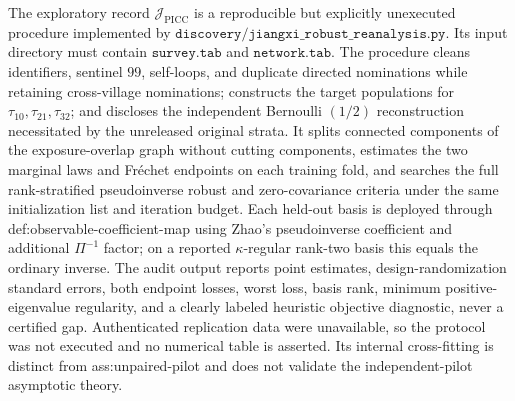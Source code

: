 The exploratory record \(\mathcal J_{\mathrm{PICC}}\) is a reproducible but explicitly unexecuted procedure implemented by \(\texttt{discovery/jiangxi\_robust\_reanalysis.py}\).  Its input directory must contain \(\texttt{survey.tab}\) and \(\texttt{network.tab}\).  The procedure cleans identifiers, sentinel \(99\), self-loops, and duplicate directed nominations while retaining cross-village nominations; constructs the target populations for \(\tau_{10},\tau_{21},\tau_{32}\); and discloses the independent Bernoulli \((1/2)\) reconstruction necessitated by the unreleased original strata.  It splits connected components of the exposure-overlap graph without cutting components, estimates the two marginal laws and Fr\'echet endpoints on each training fold, and searches the full rank-stratified pseudoinverse robust and zero-covariance criteria under the same initialization list and iteration budget.  Each held-out basis is deployed through def:observable-coefficient-map using Zhao's pseudoinverse coefficient and additional \(\Pi^{-1}\) factor; on a reported \(\kappa\)-regular rank-two basis this equals the ordinary inverse.  The audit output reports point estimates, design-randomization standard errors, both endpoint losses, worst loss, basis rank, minimum positive-eigenvalue regularity, and a clearly labeled heuristic objective diagnostic, never a certified gap.  Authenticated replication data were unavailable, so the protocol was not executed and no numerical table is asserted.  Its internal cross-fitting is distinct from ass:unpaired-pilot and does not validate the independent-pilot asymptotic theory.